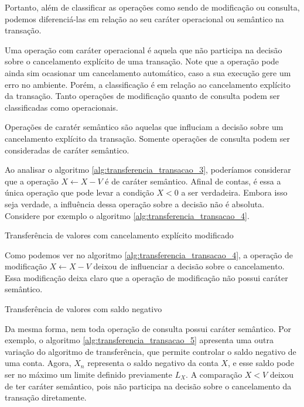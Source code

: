 \documentclass[11pt,twoside,a4paper]{book}
\begin{document}
Portanto, além de classificar as operações como sendo de modificação ou consulta, podemos diferenciá-las em relação ao seu caráter operacional ou semântico na transação.

Uma operação com caráter operacional é aquela que não participa na decisão sobre o cancelamento explícito de uma transação. Note que a operação pode ainda sim ocasionar um cancelamento automático, caso a sua execução gere um erro no ambiente. Porém, a classificação é em relação ao cancelamento explícito da transação. Tanto operações de modificação quanto de consulta podem ser classificadas como operacionais.

Operações de caratér semântico são aquelas que influciam a decisão sobre um cancelamento explícito da transação. Somente operações de consulta podem ser consideradas de caráter semântico.

Ao analisar o algoritmo \ref{alg:transferencia_transacao_3}, poderíamos considerar que a operação $X \gets X - V$ é de caráter semântico. Afinal de contas, é essa a única operação que pode levar a condição $X < 0$ a ser verdadeira. Embora isso seja verdade, a influência dessa operação sobre a decisão não é absoluta. Considere por exemplo o algoritmo \ref{alg:transferencia_transacao_4}.

\begin{algorithm}
\caption{Transferência de valores com cancelamento explícito modificado}
\label{alg:transferencia_transacao_4}
\end{algorithm}

Como podemos ver no algoritmo \ref{alg:transferencia_transacao_4}, a operação de modificação $X \gets X - V$ deixou de influenciar a decisão sobre o cancelamento. Essa modificação deixa claro que a operação de modificação não possui caráter semântico.

\begin{algorithm}
\caption{Transferência de valores com saldo negativo}
\label{alg:transferencia_transacao_5}
\end{algorithm}

Da mesma forma, nem toda operação de consulta possui caráter semântico. Por exemplo, o algoritmo \ref{alg:transferencia_transacao_5} apresenta uma outra variação do algoritmo de transferência, que permite controlar o saldo negativo de uma conta. Agora, $X_n$ representa o saldo negativo da conta $X$, e esse saldo pode ser no máximo um limite definido previamente $L_X$. A comparação $X < V$ deixou de ter caráter semântico, pois não participa na decisão sobre o cancelamento da transação diretamente.
\end{document}
